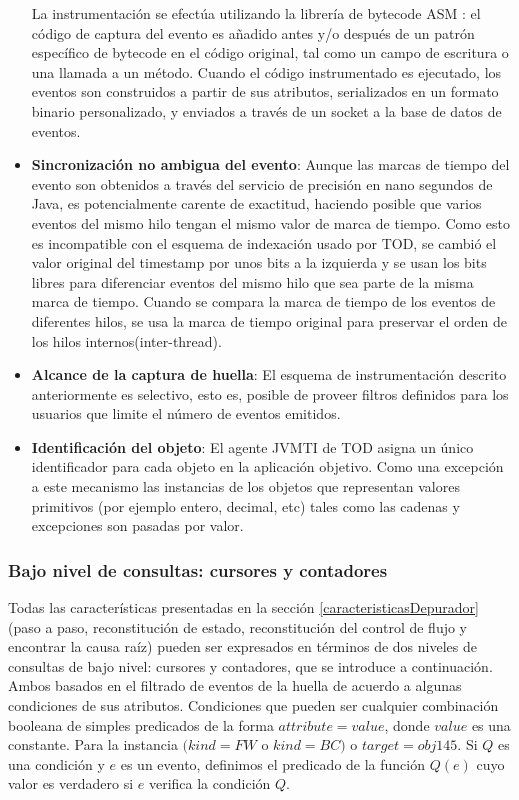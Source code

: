 \documentclass[12pt,legalpaper]{report}
\begin{document}
\begin{itemize}
La instrumentación se efectúa utilizando la librería de bytecode ASM \cite{asm}:  el código de captura del evento es añadido antes y/o después de un patrón específico de bytecode en el código original, tal como un campo de escritura o una llamada a un método.  Cuando el código instrumentado es ejecutado, los eventos son construidos a partir de sus atributos, serializados en un formato binario personalizado, y enviados a través de un socket a la base de datos de eventos.

	\item \textbf{Sincronización no ambigua del evento}: Aunque las marcas de tiempo del evento son obtenidos a través del servicio de precisión en nano segundos de Java, es potencialmente carente de exactitud, haciendo posible que varios eventos del mismo hilo tengan el mismo valor de marca de tiempo.  Como esto es incompatible con el esquema de indexación usado por TOD, se cambió el valor original del timestamp por unos bits a la izquierda y se usan los bits libres para diferenciar eventos del mismo hilo que sea parte de la misma marca de tiempo.  Cuando se compara la marca de tiempo de los eventos de diferentes hilos, se usa la marca de tiempo original para preservar el orden de los hilos internos(inter-thread).

	\item \textbf{Alcance de la captura de huella}: El esquema de instrumentación descrito anteriormente es selectivo, esto es, posible de proveer filtros definidos para los usuarios que limite el número de eventos emitidos.

	\item \textbf{Identificación del objeto}: El agente JVMTI de TOD asigna un único identificador para cada objeto en la aplicación objetivo.  Como una excepción a este mecanismo las instancias de los objetos que representan valores primitivos (por ejemplo entero, decimal, etc) tales como las cadenas y excepciones son pasadas por valor.
\end{itemize}

			\subsubsection[Bajo nivel de consultas]{Bajo nivel de consultas: cursores y contadores}

	Todas las características presentadas en la sección \ref{caracteristicasDepurador} (paso a paso, reconstitución de estado, reconstitución del control de flujo y encontrar la causa raíz) pueden ser expresados en términos de dos niveles de consultas de bajo nivel:  cursores y contadores, que se introduce a continuación.  Ambos basados en el filtrado de eventos de la huella de acuerdo a algunas condiciones de sus atributos.  Condiciones que pueden ser cualquier combinación booleana de simples predicados de la forma $attribute = value$, donde $value$ es una constante.  Para la instancia $(kind = FW$ o $kind = BC)$ o $target = obj145$.  Si $Q$ es una condición y $e$ es un evento, definimos el predicado de la función $Q(e)$ cuyo valor es verdadero si $e$ verifica la condición $Q$.
\end{document}
